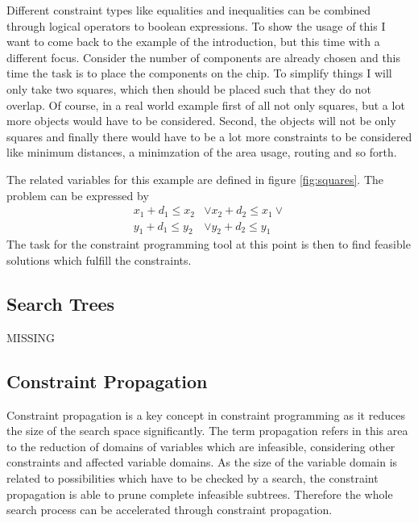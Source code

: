 \documentclass[10pt,
               a4paper,
               journal,
               ]{IEEEtran}
\newcommand{\reffig}[1]{{figure \ref{#1}}}
\begin{document}
	Different constraint types like equalities and inequalities can be combined through logical operators to boolean expressions. To show the usage of this  I want to come back to the example of the introduction, but this time with a different focus. Consider the number of components are already chosen and this time the task is to place the components on the chip. To simplify things I will only take two squares, which then should be placed such that they do not overlap. Of course, in a real world example first of all not only squares, but a lot more objects would have to be considered. Second, the objects will not be only squares and finally there would have to be a lot more constraints to be considered like minimum distances, a minimzation of the area usage, routing and so forth. 
	
	The related variables for this example are defined in \reffig{fig:squares}. The problem can be expressed by \cite[p. 101]{programmingGecode}
	\begin{equation}
	\begin{split}
		x_1 + d_1 \le x_2 & \lor x_2 + d_2 \le x_1 \lor \\
		y_1 + d_1 \le y_2 & \lor y_2 + d_2 \le y_1
	\end{split}
	\end{equation}
	The task for the constraint programming tool at this point is then to find feasible solutions which fulfill the constraints.
	
	\subsection{Search Trees}
	MISSING
	
	\subsection{Constraint Propagation}
	Constraint propagation is a key concept in constraint programming as it reduces the size of the search space significantly. The term propagation refers in this area to the reduction of domains of variables which are infeasible, considering other constraints and affected variable domains. As the size of the variable domain is related to possibilities which have to be checked by a search, the constraint propagation is able to prune complete infeasible subtrees. Therefore the whole search process can be accelerated through constraint propagation.
	
\end{document}
